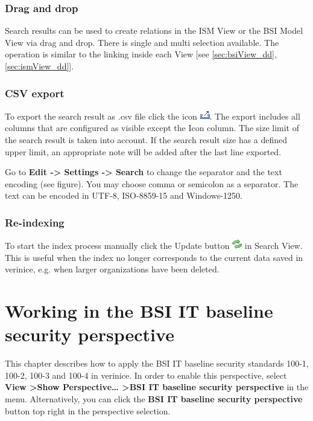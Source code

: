 \documentclass[a4paper,10pt]{book}
\begin{document}
\subsection{Drag and drop}
Search results can be used to create relations in the ISM View or the BSI Model
View via drag and drop. There is single and multi selection
available. The operation is similar to the linking inside each View [see
\ref{sec:bsiView_dd}, \ref{sec:ismView_dd}].

\subsection{CSV export}
\label{sec:csv-export}

To export the search result as .csv file click the
icon \includegraphics[height=2ex]{Icon/Export.png}. The export
includes all columns that are configured as visible except the Icon
column. The size limit of the search result is taken into account. If
the search result size has a defined upper limit, an appropriate note
will be added after the last line exported.

Go to \textbf{Edit -> Settings -> Search} to change the separator and
the text encoding (see figure). You may choose comma or semicolon as a
separator. The text can be encoded in UTF-8, ISO-8859-15 and
Windows-1250.

\subsection{Re-indexing}
\label{sec:reindexing}

To start the index process manually click the Update
button \includegraphics[height=2ex]{Icon/Aktualisieren.png} in Search
View. This is useful when the index no longer corresponds to the
current data saved in verinice, e.g. when larger organizations have
been deleted.



\chapter{Working in the BSI IT baseline security perspective} \label{Working in the BSI IT baseline security perspective}
This chapter describes how to apply the BSI IT baseline security standards
100-1, 100-2, 100-3 and 100-4 in verinice.  In order to enable this
perspective, select \textbf{View \textgreater Show Perspective\ldots
\textgreater BSI IT baseline security perspective} in the menu. Alternatively,
you can click the \textbf{BSI IT baseline security perspective} button top
right in the perspective selection.
\end{document}
